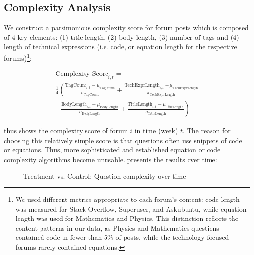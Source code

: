 
\subsection{Complexity Analysis}

We construct a parsimonious complexity score for forum posts which is composed of 4 key elements: (1) title length, (2) body length, (3) number of tags and (4) length of technical expressions (i.e. code, or equation length for the respective forums)\footnote{We used different metrics appropriate to each forum's content: code length was measured for Stack Overflow, Superuser, and Askubuntu, while equation length was used for Mathematics and Physics. This distinction reflects the content patterns in our data, as Physics and Mathematics questions contained code in fewer than 5\% of posts, while the technology-focused forums rarely contained equations.}:

\begin{multline}\label{eq:cscore}
    \text{Complexity Score}_{i,t} = \\ 
    \frac{1}{4} \left( \frac{\text{TagCount}_{i,t} - \mu_{\text{TagCount}}}{\sigma_{\text{TagCount}}} + \frac{\text{TechExprLength}_{i,t} - \mu_{\text{TechExprLength}}}{\sigma_{\text{TechExprLength}}} \right. \\
    \left. + \frac{\text{BodyLength}_{i,t} - \mu_{\text{BodyLength}}}{\sigma_{\text{BodyLength}}} + \frac{\text{TitleLength}_{i,t} - \mu_{\text{TitleLength}}}{\sigma_{\text{TitleLength}}} \right)
\end{multline}

 thus shows the complexity score of forum $i$ in time (week) $t$. The reason for choosing this relatively simple score is that questions often use snippets of code or equations. Thus, more sophisticated and established equation or code complexity algorithms become unusable.  presents the results over time:

\begin{figure}[H]
    \centering
    
    \caption{Treatment vs. Control: Question complexity over time}
    \label{fig:complex}
\end{figure}



